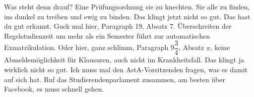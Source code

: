 \begin{verseplay}[4em]
\s{\Frodo} Was steht denn drauf?
\s{\Gandalf} 
					Eine Prüfungsordnung sie zu knechten.
					Sie alle zu finden,
					ins dunkel zu treiben
					und ewig zu binden.
\s{\Frodo} Das klingt jetzt nicht so gut.
\s{\Gandalf} Das hast du gut erkannt.
				Guck mal hier, Paragraph 19, Absatz 7. Überschreiten der Regelstudienzeit um mehr als ein Semester führt zur automatischen Exmatrikulation.
				Oder hier,  ganz schlimm, Paragraph 9$\dfrac{3}{4}$, Absatz $\pi$, keine Abmeldemöglichkeit für Klausuren, auch nicht im Krankheitsfall.
\s{\Frodo} Das klingt ja wirklich nicht so gut.
\s{\Gandalf} Ich muss mal den AstA-Vorsitzenden \Saruman fragen, was es damit auf sich hat. Ruf das Studierendenparlament zusammen, am besten über Facebook, es muss schnell gehen.
			 
\end{verseplay}

